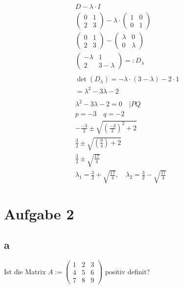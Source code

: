 \begin{align*}
    D - \lambda \cdot I \\
        \begin{pmatrix}
        0 & 1 \\
        2 & 3
    \end{pmatrix} - \lambda \cdot \begin{pmatrix}
        1 & 0 \\
        0 & 1
    \end{pmatrix} \\
    \begin{pmatrix}
        0 & 1 \\
        2 & 3
    \end{pmatrix} - \begin{pmatrix}
        \lambda & 0 \\
        0 & \lambda
    \end{pmatrix} \\
    \begin{pmatrix}
        -\lambda & 1 \\
        2 & 3 - \lambda
    \end{pmatrix} =: D_\lambda\\\\
    \det(D_\lambda) = -\lambda \cdot (3 - \lambda) - 2 \cdot 1 \\
    = \lambda^2 - 3 \lambda - 2 \\\\
    \lambda^2 - 3 \lambda - 2 = 0 \quad | PQ\\
    p = -3 \quad q = -2 \\
    -\frac{-3}{2} \pm \sqrt{\left(\frac{-3}{2}\right)^2 + 2} \\
    \frac{3}{2} \pm \sqrt{\left(\frac{9}{4}\right) + 2} \\
    \frac{3}{2} \pm \sqrt{\frac{17}{4}} \\
    \lambda_1 = \frac{3}{2} + \sqrt{\frac{17}{4}}, \quad \lambda_2 = \frac{3}{2} - \sqrt{\frac{17}{4}}
\end{align*}

\section{Aufgabe 2}

\subsection{a}

Ist die Matrix $A := \begin{pmatrix}
    1 & 2 & 3 \\
    4 & 5 & 6 \\
    7 & 8 & 9
\end{pmatrix}$ positiv definit?

